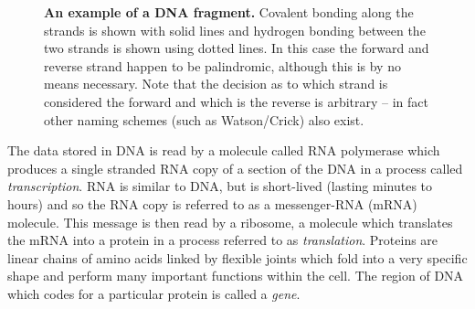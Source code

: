 \begin{figure}
  \centering
  \caption{
    \textbf{An example of a DNA fragment.} 
    Covalent bonding along the strands is shown with solid lines and hydrogen 
    bonding between the two strands is shown using dotted lines.
    In this case the forward and reverse strand happen to be palindromic, 
    although this is by no means necessary.
    Note that the decision as to which strand is considered the forward and
    which is the reverse is arbitrary -- in fact other naming schemes (such as
    Watson/Crick) also exist.
  }
  \label{fig:dna_pairing}
\end{figure}


The data stored in DNA is read by a molecule called RNA polymerase which 
produces a single stranded RNA copy of a section of the DNA in a process called
\textit{transcription}.
RNA is similar to DNA, but is short-lived (lasting minutes to hours) and so the
RNA copy is referred to as a messenger-RNA (mRNA) molecule.
This message is then read by a ribosome, a molecule which translates the mRNA 
into a protein in a process referred to as \textit{translation}.
Proteins are linear chains of amino acids linked by flexible joints which fold 
into a very specific shape and perform many important functions within the 
cell.
The region of DNA which codes for a particular protein is called a 
\textit{gene}.

